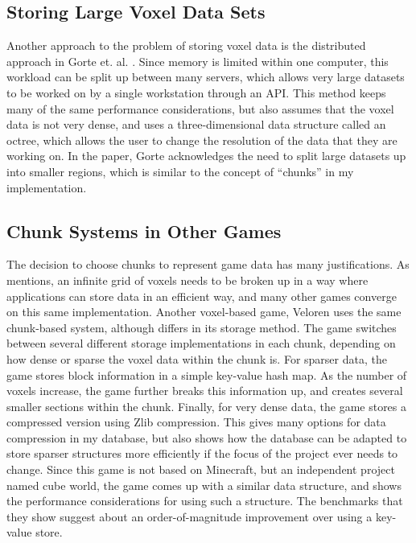 \documentclass[10pt,twocolumn]{article}
\begin{document}
\subsection{Storing Large Voxel Data Sets}

Another approach to the problem of storing voxel data is the distributed
approach in Gorte et. al. \cite{gorte2023analysis}. Since memory is limited
within one computer, this workload can be split up between many servers, which
allows very large datasets to be worked on by a single workstation through an
API. This method keeps many of the same performance considerations, but also
assumes that the voxel data is not very dense, and uses a three-dimensional
data structure called an octree, which allows the user to change the resolution
of the data that they are working on. In the paper, Gorte acknowledges the need
to split large datasets up into smaller regions, which is similar to the concept
of ``chunks'' in my implementation.

\subsection{Chunk Systems in Other Games}

The decision to choose chunks to represent game data has many justifications. As
\cite{gorte2023analysis} mentions, an infinite grid of voxels needs to be broken
up in a way where applications can store data in an efficient way, and many
other games converge on this same implementation. Another voxel-based game,
Veloren\cite{https://veloren.net} uses the same chunk-based system, although
differs in its storage method. The game switches between several different
storage implementations in each chunk, depending on how dense or sparse the voxel
data within the chunk is. For sparser data, the game stores block information in
a simple key-value hash map. As the number of voxels increase, the game further
breaks this information up, and creates several smaller sections within the
chunk. Finally, for very dense data, the game stores a compressed version using
Zlib compression\cite{veloren32}. This gives many options for data compression
in my database, but also shows how the database can be adapted to store sparser
structures more efficiently if the focus of the project ever needs to change.
Since this game is not based on Minecraft, but an independent project named cube
world, the game comes up with a similar data structure, and shows the
performance considerations for using such a structure. The benchmarks that they
show suggest about an order-of-magnitude improvement over using a key-value
store.
\end{document}
